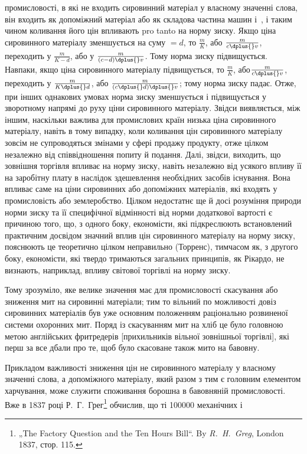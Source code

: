 \parcont{}  %
промисловості, в які не входить сировинний матеріал у власному значенні слова, він входить як
допоміжний матеріал або як складова частина машин і~, і таким чином коливання його цін
впливають pro tanto на норму зиску. Якщо ціна сировинного матеріалу зменшується на суму $= d$, то $\frac{m}{K}$,
або $\frac{m}{c \dplus{} v}$, переходить у $\frac{m}{K - d}$, або у
$\frac{m}{(c - d) \dplus{} v}$. Тому норма зиску підвищується. Навпаки, якщо ціна сировинного матеріалу
підвищується, то $\frac{m}{K}$, або$\frac{m}{c \dplus{} v}$, переходить у $\frac{m}{K \dplus{} d}$,
або $\frac{m}{(c \dplus{} d) \dplus{} v}$; тому норма зиску
падає. Отже, при інших однакових умовах норма
зиску зменшується і підвищується у зворотному напрямі до руху ціни сировинного матеріалу. Звідси
виявляється, між іншим, наскільки важлива для промислових країн низька ціна сировинного матеріалу,
навіть в тому випадку, коли коливання цін сировинного матеріалу зовсім не супроводяться змінами у
сфері продажу продукту, отже цілком незалежно від співвідношення попиту й подання. Далі, звідси,
виходить, що зовнішня торгівля впливає на норму зиску, навіть незалежно від усякого впливу її на
заробітну плату в наслідок здешевлення необхідних засобів існування. Вона впливає саме на ціни
сировинних або допоміжних матеріалів, які входять у промисловість або землеробство. Цілком
недостатнє ще й досі розуміння природи норми зиску та її специфічної відмінності від норми
додаткової вартості є причиною того, що, з одного боку, економісти, які підкреслюють встановлений
практичним досвідом значний вплив цін сировинного матеріалу на норму зиску, пояснюють це теоретично
цілком неправильно (Торренс), тимчасом як, з другого боку, економісти, які твердо тримаються
загальних принципів, як Рікардо, не визнають, наприклад, впливу світової торгівлі на норму зиску.

Тому зрозуміло, яке велике значення має для промисловості скасування або зниження мит на сировинні
матеріали; тим то вільний по можливості довіз сировинних матеріалів був уже основним положенням
раціонально розвиненої системи охоронних мит. Поряд із скасуванням мит на хліб це було головною
метою англійських фритредерів [прихильників вільної зовнішньої торгівлі], які перш за все дбали про
те, щоб було скасоване також мито на бавовну.

Прикладом важливості зниження цін не сировинного матеріалу у власному значенні слова, а допоміжного
матеріалу, який разом з тим є головним елементом харчування, може служити споживання борошна в
бавовняній промисловості. Вже в 1837 році Р.~Г.~Грег\footnote{
„The Factory Question and the Ten Hours Bill“. By \emph{R.~H.~Greg}, London 1837, стор. 115.
} обчислив, що ті \num{100000} механічних і
\parbreak{}  %
